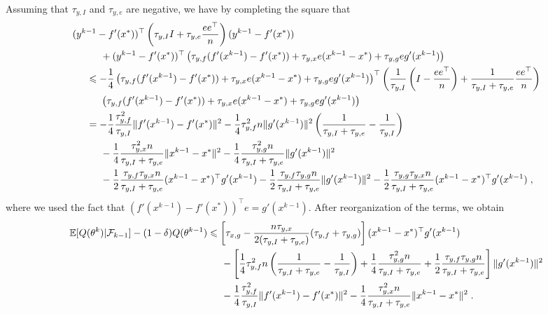 \documentclass{article}
\def\E{_{\scriptscriptstyle E}}
\def \E{{\mathbb E}}
\def \E{{\mathbb E}}
\begin{document}
Assuming that $\tau_{y, I}$ and $\tau_{y, e}$ are negative, we have by completing the square that
\begin{align*}
&(y^{k-1} - f'(x^\ast))^\top \left(\tau_{y, I}I + \tau_{y, e}\frac{ee^\top}{n}\right)(y^{k-1} - f'(x^\ast))\\
&\hspace*{1cm} + (y^{k-1} - f'(x^\ast))^\top\left(\tau_{y, f}( f'(x^{k-1}) - f'(x^\ast)) + \tau_{y, x}e (x^{k-1} -x^\ast) + \tau_{y, g}e g'(x^{k-1})\right)\\
&\hspace*{.5cm}\leqslant -\frac{1}{4} \left(\tau_{y, f}( f'(x^{k-1}) - f'(x^\ast)) + \tau_{y, x}e (x^{k-1} -x^\ast) + \tau_{y, g}e g'(x^{k-1})\right)^\top\left(\frac{1}{\tau_{y,I}}\left(I - \frac{ee^\top}{n}\right) + \frac{1}{\tau_{y,I} + \tau_{y,e}}\frac{ee^\top}{n}\right)\\
&\hspace*{1cm}\left(\tau_{y, f}( f'(x^{k-1}) - f'(x^\ast)) + \tau_{y, x}e (x^{k-1} -x^\ast) + \tau_{y, g}e g'(x^{k-1})\right)\\
&\hspace*{.5cm}= -\frac{1}{4}\frac{\tau_{y, f}^2}{\tau_{y,I}}\|f'(x^{k-1}) - f'(x^\ast)\|^2 -\frac{1}{4}\tau_{y, f}^2n \|g'(x^{k-1})\|^2\left(\frac{1}{\tau_{y,I} + \tau_{y,e}} - \frac{1}{\tau_{y,I}}\right)\\
&\hspace*{1cm}-\frac{1}{4}\frac{\tau_{y,x}^2n}{\tau_{y,I} + \tau_{y,e}}\|x^{k-1} -x^\ast\|^2 -\frac{1}{4}\frac{\tau_{y,g}^2n}{\tau_{y,I} + \tau_{y,e}}\|g'(x^{k-1})\|^2\\
&\hspace*{1cm}-\frac{1}{2}\frac{\tau_{y,f}\tau_{y,x}n}{\tau_{y,I} + \tau_{y,e}}(x^{k-1} -x^\ast)^\top g'(x^{k-1}) -\frac{1}{2}\frac{\tau_{y,f}\tau_{y,g}n}{\tau_{y,I} + \tau_{y,e}}\|g'(x^{k-1}) \|^2 -\frac{1}{2}\frac{\tau_{y,g}\tau_{y,x}n}{\tau_{y,I} + \tau_{y,e}}(x^{k-1} -x^\ast)^\top g'(x^{k-1}) \; ,
\end{align*}
where we used the fact that $( f'(x^{k-1}) - f'(x^\ast))^\top e = g'(x^{k-1})$. After reorganization of the terms, we obtain
\begin{align*}
\E [ Q(\theta^k) | \mathcal{F}_{k-1} ] - ( 1 - \delta) Q(\theta^{k-1}) &\leqslant \left[\tau_{x,g} - \frac{n\tau_{y,x}}{2(\tau_{y,I} + \tau_{y,e})}(\tau_{y,f} + \tau_{y,g}) \right](x^{k-1} -x^\ast)^\top g'(x^{k-1})\\
& \hspace*{.5cm} -\left[\frac{1}{4}\tau_{y, f}^2n\left(\frac{1}{\tau_{y,I} + \tau_{y,e}} - \frac{1}{\tau_{y,I}}\right) + \frac{1}{4}\frac{\tau_{y,g}^2n}{\tau_{y,I} + \tau_{y,e}} + \frac{1}{2}\frac{\tau_{y,f}\tau_{y,g}n}{\tau_{y,I} + \tau_{y,e}}\right]\|g'(x^{k-1}) \|^2\\
& \hspace*{.5cm} -\frac{1}{4}\frac{\tau_{y, f}^2}{\tau_{y,I}}\|f'(x^{k-1}) - f'(x^\ast)\|^2 -\frac{1}{4}\frac{\tau_{y,x}^2n}{\tau_{y,I} + \tau_{y,e}}\|x^{k-1} -x^\ast\|^2 \; .
\end{align*}
\end{document}
